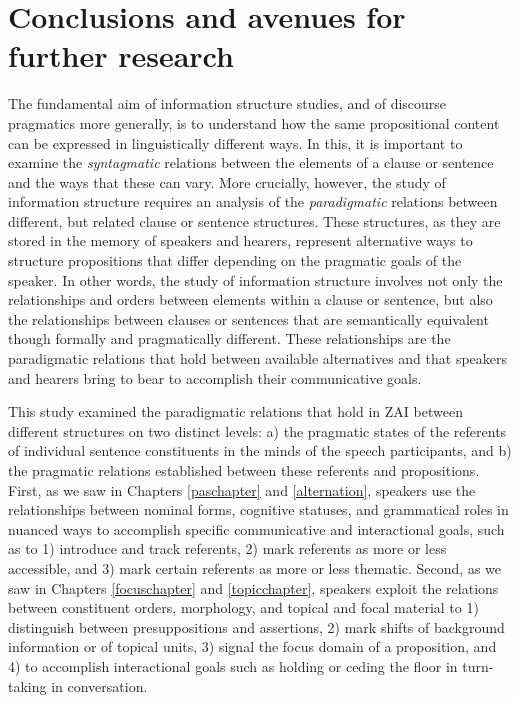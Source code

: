 
\chapter{Conclusions and avenues for further research}


The fundamental aim of information structure studies, and of discourse pragmatics more generally, is to understand how the same propositional content can be expressed in linguistically different ways. In this, it is important to examine the \textit{syntagmatic} relations between the elements of a clause or sentence and the ways that these can vary. More crucially, however, the study of information structure requires an analysis of the \textit{paradigmatic} relations between different, but related clause or sentence structures. These structures, as they are stored in the memory of speakers and hearers, represent alternative ways to structure propositions that differ depending on the pragmatic goals of the speaker. In other words, the study of information structure involves not only the relationships and orders between elements within a clause or sentence, but also the relationships between clauses or sentences that are semantically equivalent though formally and pragmatically different. These relationships are the paradigmatic relations that hold between available alternatives and that speakers and hearers bring to bear to accomplish their communicative goals. 

This study examined the paradigmatic relations that hold in ZAI between different structures on two distinct levels: a) the pragmatic states of the referents of individual sentence constituents in the minds of the speech participants, and b) the pragmatic relations established between these referents and propositions. First, as we saw in Chapters \ref{paschapter} and \ref{alternation}, speakers use the relationships between nominal forms, cognitive statuses, and grammatical roles in nuanced ways to accomplish specific communicative and interactional goals, such as to 1) introduce and track referents, 2) mark referents as more or less accessible, and 3) mark certain referents as more or less thematic. Second, as we saw in Chapters \ref{focuschapter} and \ref{topicchapter}, speakers exploit the relations between constituent orders, morphology, and topical and focal material to 1) distinguish between presuppositions and assertions, 2) mark shifts of background information or of topical units, 3) signal the focus domain of a proposition, and 4) to accomplish interactional goals such as holding or ceding the floor in turn-taking in conversation.

